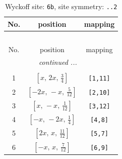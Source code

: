 \documentclass[fleqn,8pt]{jsarticle}
\begin{document}
\begin{longtable}{ccc}
\caption{Wyckoff site: {\tt 6b}, site symmetry: {\tt ..2}}
 \\
 \hline \hline
No. & position & mapping \\ \hline \endfirsthead

\multicolumn{2}{l}{\tablename\ \thetable{}} \\
 \hline \hline
No. & position & mapping \\ \hline \endhead

 \hline \hline
\multicolumn{2}{r}{\footnotesize\it continued ...} \\ \endfoot

 \hline \hline
\multicolumn{2}{r}{} \\ \endlastfoot

1 & $\left[ x,\, 2 x,\, \frac{3}{4} \right]$ & {\tt [1,11]} \\ \hline
2 & $\left[ - 2 x,\, - x,\, \frac{5}{12} \right]$ & {\tt [2,10]} \\ \hline
3 & $\left[ x,\, - x,\, \frac{1}{12} \right]$ & {\tt [3,12]} \\ \hline
4 & $\left[ - x,\, - 2 x,\, \frac{1}{4} \right]$ & {\tt [4,8]} \\ \hline
5 & $\left[ 2 x,\, x,\, \frac{11}{12} \right]$ & {\tt [5,7]} \\ \hline
6 & $\left[ - x,\, x,\, \frac{7}{12} \right]$ & {\tt [6,9]} \\
\end{longtable}
\renewcommand{\arraystretch}{1.2}
\end{document}
